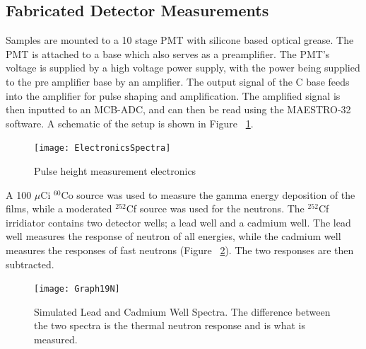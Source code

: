 \documentclass{anstrans}
\newcommand{\iso}[2]{${}^{#2}${#1}}
\begin{document}
\subsection{Fabricated Detector Measurements}
Samples are mounted to a 10 stage PMT with silicone based optical grease.
The PMT is attached to a base which also serves as a preamplifier.   
The PMT's voltage is supplied by a high voltage power supply, with the power being supplied to the pre amplifier base by an amplifier.  
The output signal of the C base feeds into the amplifier for pulse shaping and amplification. 
The amplified signal is then inputted to an MCB-ADC, and can then be read using the MAESTRO-32 software. 
A schematic of the setup is shown in Figure ~\ref{fig:ElectronicsSpectra}.
\begin{figure}
	\centering
	\texttt{[image: ElectronicsSpectra]}
	\caption{Pulse height measurement electronics}
	\label{fig:ElectronicsSpectra}
\end{figure}
A 100 $\mu$Ci \iso{Co}{60} source was used to measure the gamma energy deposition of the films, while a moderated \iso{Cf}{252} source was used for the neutrons.
The \iso{Cf}{252} irridiator contains two detector wells; a lead well and a cadmium well.
The lead well measures the response of neutron of all energies, while the cadmium well measures the responses of fast neutrons (Figure ~\ref{fig:SimPbCdSpectra}).
The two responses are then subtracted.
\begin{figure}
	\centering
	\texttt{[image: Graph19N]}
	\caption{Simulated Lead and Cadmium Well Spectra. The difference between the two spectra is the thermal neutron response and is what is measured.}
	\label{fig:SimPbCdSpectra}
\end{figure}
\end{document}
